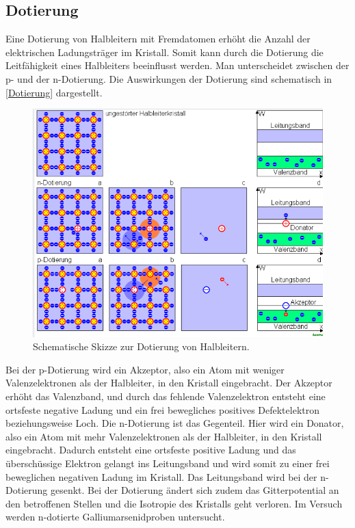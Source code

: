\subsection{Dotierung}
\label{sub:Dotierung}

Eine Dotierung von Halbleitern mit Fremdatomen erhöht die Anzahl der elektrischen Ladungsträger im Kristall.
Somit kann durch die Dotierung die Leitfähigkeit eines Halbleiters beeinflusst werden.
Man unterscheidet zwischen der p- und der n-Dotierung. Die Auswirkungen der Dotierung sind schematisch in \autoref{Dotierung} dargestellt.
\begin{figure}[H]
    \centering
    \includegraphics[scale=0.45]{Abbildungen/Dotierung.png}
    \caption{Schematische Skizze zur Dotierung von Halbleitern.\cite{Dotierung}}
    \label{fig:Dotierung}
\end{figure}
Bei der p-Dotierung wird ein Akzeptor, also ein Atom mit weniger Valenzelektronen als der Halbleiter, in den Kristall eingebracht.
Der Akzeptor erhöht das Valenzband, und durch das fehlende Valenzelektron entsteht eine ortsfeste negative Ladung und ein frei bewegliches
positives Defektelektron beziehungsweise Loch.
Die n-Dotierung ist das Gegenteil. Hier wird ein Donator, also ein Atom mit mehr Valenzelektronen als der Halbleiter, in den Kristall eingebracht.
Dadurch entsteht eine ortsfeste positive Ladung und das überschüssige Elektron gelangt ins Leitungsband und wird somit zu einer frei beweglichen
negativen Ladung im Kristall. Das Leitungsband wird bei der n-Dotierung gesenkt.
Bei der Dotierung ändert sich zudem das Gitterpotential an den betroffenen Stellen und die Isotropie des Kristalls geht verloren.
Im Versuch werden n-dotierte Galliumarsenidproben untersucht.



